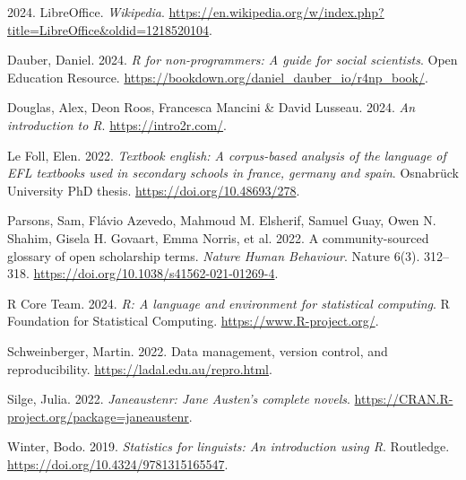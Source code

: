 \documentclass[
  letterpaper,
  DIV=11,
  numbers=noendperiod]{scrreprt}
\newlength{\cslhangindent}
\newenvironment{CSLReferences}[2] %
 {\begin{list}{}{%
  \setlength{\itemindent}{0pt}
  \setlength{\leftmargin}{0pt}
  \setlength{\parsep}{0pt}
  \ifodd #1
   \setlength{\leftmargin}{\cslhangindent}
   \setlength{\itemindent}{-1\cslhangindent}
  \fi
  \setlength{\itemsep}{#2\baselineskip}}}
 {\end{list}}
\begin{document}
\label{refs}
\begin{CSLReferences}{1}{0}
2024. LibreOffice. \emph{Wikipedia}.
\url{https://en.wikipedia.org/w/index.php?title=LibreOffice&oldid=1218520104}.

Dauber, Daniel. 2024. \emph{R for non-programmers: A guide for social
scientists}. Open Education Resource.
\url{https://bookdown.org/daniel_dauber_io/r4np_book/}.

Douglas, Alex, Deon Roos, Francesca Mancini \& David Lusseau. 2024.
\emph{An introduction to {R}}. \url{https://intro2r.com/}.

Le Foll, Elen. 2022. \emph{Textbook english: A corpus-based analysis of
the language of EFL textbooks used in secondary schools in france,
germany and spain}. Osnabrück University PhD thesis.
\url{https://doi.org/10.48693/278}.

Parsons, Sam, Flávio Azevedo, Mahmoud M. Elsherif, Samuel Guay, Owen N.
Shahim, Gisela H. Govaart, Emma Norris, et al. 2022. A community-sourced
glossary of {open} {scholarship} terms. \emph{Nature Human Behaviour}.
Nature 6(3). 312--318. \url{https://doi.org/10.1038/s41562-021-01269-4}.

R Core Team. 2024. \emph{R: A language and environment for statistical
computing}. R Foundation for Statistical Computing.
\url{https://www.R-project.org/}.

Schweinberger, Martin. 2022. Data management, version control, and
reproducibility. \url{https://ladal.edu.au/repro.html}.

Silge, Julia. 2022. \emph{Janeaustenr: Jane {Austen}'s complete novels}.
\url{https://CRAN.R-project.org/package=janeaustenr}.

Winter, Bodo. 2019. \emph{Statistics for linguists: An introduction
using {R}}. Routledge. \url{https://doi.org/10.4324/9781315165547}.

\end{CSLReferences}
\end{document}
